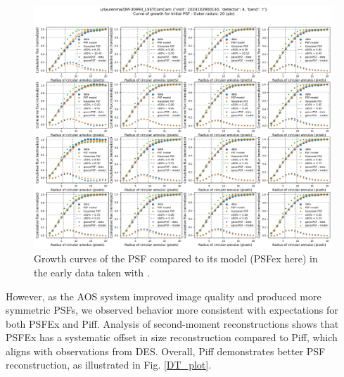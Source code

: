 \begin{figure}
        \centering
        \includegraphics[scale=0.2]{figures/curveOfGrowth_pfsex_u_laurenma_DM-30993_LSSTComCam_2024102900140_4}
        \caption{\small Growth curves of the PSF compared to its model (PSFex here)  in the early data taken with \ComCam. }
        \label{growth_plot}
\end{figure}



However, as the AOS system improved image quality and produced more symmetric PSFs, we observed behavior more consistent with expectations for both PSFEx and Piff. 
Analysis of second-moment reconstructions shows that PSFEx has a systematic offset in size reconstruction compared to Piff, which aligns with observations from DES. Overall, Piff demonstrates better PSF reconstruction, as illustrated in Fig. \ref{DT_plot}. 

